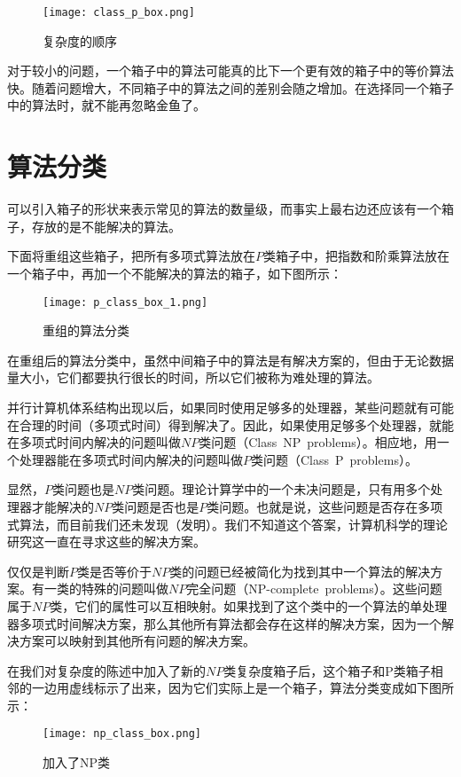 \begin{figure}[!h]
\centering
\texttt{[image: class\_p\_box.png]}
\caption{复杂度的顺序}
\end{figure}

对于较小的问题，一个箱子中的算法可能真的比下一个更有效的箱子中的等价算法快。随着问题增大，不同箱子中的算法之间的差别会随之增加。在选择同一个箱子中的算法时，就不能再忽略金鱼了。


\section{算法分类}

可以引入箱子的形状来表示常见的算法的数量级，而事实上最右边还应该有一个箱子，存放的是不能解决的算法。

下面将重组这些箱子，把所有多项式算法放在$P$类箱子中，把指数和阶乘算法放在一个箱子中，再加一个不能解决的算法的箱子，如下图所示：

\begin{figure}[htbp]
\centering
\texttt{[image: p\_class\_box\_1.png]}
\caption{重组的算法分类}
\end{figure}

在重组后的算法分类中，虽然中间箱子中的算法是有解决方案的，但由于无论数据量大小，它们都要执行很长的时间，所以它们被称为{\heiti 难处理的算法。}

并行计算机体系结构出现以后，如果同时使用足够多的处理器，某些问题就有可能在合理的时间（多项式时间）得到解决了。因此，如果使用足够多个处理器，就能在多项式时间内解决的问题叫做$NP$类问题（Class~NP~problems）。相应地，用一个处理器能在多项式时间内解决的问题叫做$P$类问题（Class~P~problems）。

显然，$P$类问题也是$NP$类问题。理论计算学中的一个未决问题是，只有用多个处理器才能解决的$NP$类问题是否也是$P$类问题。也就是说，这些问题是否存在多项式算法，而目前我们还未发现（发明）。我们不知道这个答案，计算机科学的理论研究这一直在寻求这些的解决方案。

仅仅是判断$P$类是否等价于$NP$类的问题已经被简化为找到其中一个算法的解决方案。有一类的特殊的问题叫做$NP$完全问题（NP-complete~problems）。这些问题属于$NP$类，它们的属性可以互相映射。如果找到了这个类中的一个算法的单处理器多项式时间解决方案，那么其他所有算法都会存在这样的解决方案，因为一个解决方案可以映射到其他所有问题的解决方案。

在我们对复杂度的陈述中加入了新的$NP$类复杂度箱子后，这个箱子和P类箱子相邻的一边用虚线标示了出来，因为它们实际上是一个箱子，算法分类变成如下图所示：

\begin{figure}[htbp]
\centering
\texttt{[image: np\_class\_box.png]}
\caption{加入了NP类}
\end{figure}




